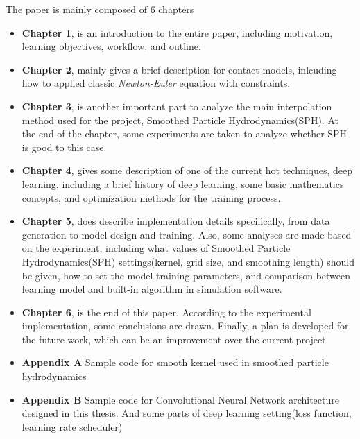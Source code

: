         The paper is mainly composed of 6 chapters
    \begin{itemize}
        \item \textbf{Chapter 1}, is an introduction to the entire paper, including motivation, learning objectives, workflow, and outline.

        \item \textbf{Chapter 2}, mainly gives a brief description for contact models, inlcuding how to applied classic \textit{Newton-Euler} equation with constraints.

        \item \textbf{Chapter 3}, is another important part to analyze the main interpolation method used for the project, Smoothed Particle Hydrodynamics(SPH). At the end of the chapter, some experiments are taken to analyze whether SPH is good to this case.

        \item \textbf{Chapter 4}, gives some description of one of the current hot techniques, deep learning, including a brief history of deep learning, some basic mathematics concepts, and optimization methods for the training process.

        \item \textbf{Chapter 5}, does describe implementation details specifically, from data generation to model design and training. Also, some analyses are made based on the experiment, including what values of Smoothed Particle Hydrodynamics(SPH) settings(kernel, grid size, and smoothing length) should be given, how to set the model training parameters, and comparison between learning model and built-in algorithm in simulation software.

        \item \textbf{Chapter 6}, is the end of this paper. According to the experimental implementation, some conclusions are drawn. Finally, a plan is developed for the future work, which can be an improvement over the current project.

        \item \textbf{Appendix A} Sample code for smooth kernel used in smoothed particle hydrodynamics

        \item \textbf{Appendix B} Sample code for Convolutional Neural Network architecture designed in this thesis. And some parts of deep learning setting(loss function, learning rate scheduler)
    \end{itemize}


